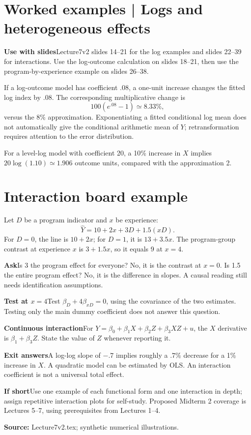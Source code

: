 \documentclass[11pt,a4paper]{article}
\newcommand{\heading}[1]{\section*{\color{accent}#1}}
\newcommand{\cue}[2]{\par\noindent\textbf{#1}\quad #2\par}
\begin{document}
\newpage
\heading{Worked examples | Logs and heterogeneous effects}
\cue{Use with slides}{Lecture7v2 slides 14--21 for the log examples and slides 22--39 for interactions. Use the log-outcome calculation on slides 18--21, then use the program-by-experience example on slides 26--38.}
If a log-outcome model has coefficient $.08$, a one-unit increase changes the fitted log index by $.08$. The corresponding multiplicative change is
\[
100(e^{.08}-1)\simeq8.33\%,
\]
versus the 8\% approximation. Exponentiating a fitted conditional log mean does not automatically give the conditional arithmetic mean of $Y$; retransformation requires attention to the error distribution.

For a level-log model with coefficient 20, a 10\% increase in $X$ implies $20\log(1.10)\simeq1.906$ outcome units, compared with the approximation 2.
\heading{Interaction board example}
Let $D$ be a program indicator and $x$ be experience:
\[
\widehat Y=10+2x+3D+1.5(xD).
\]
For $D=0$, the line is $10+2x$; for $D=1$, it is $13+3.5x$. The program-group contrast at experience $x$ is $3+1.5x$, so it equals 9 at $x=4$.
\cue{Ask}{Is 3 the program effect for everyone? No, it is the contrast at $x=0$. Is 1.5 the entire program effect? No, it is the difference in slopes. A causal reading still needs identification assumptions.}
\cue{Test at $x=4$}{Test $\beta_D+4\beta_{xD}=0$, using the covariance of the two estimates. Testing only the main dummy coefficient does not answer this question.}
\cue{Continuous interaction}{For $Y=\beta_0+\beta_1X+\beta_2Z+\beta_3XZ+u$, the $X$ derivative is $\beta_1+\beta_3Z$. State the value of $Z$ whenever reporting it.}
\cue{Exit answers}{A log-log slope of $-.7$ implies roughly a $.7$\% decrease for a 1\% increase in $X$. A quadratic model can be estimated by OLS. An interaction coefficient is not a universal total effect.}
\cue{If short}{Use one example of each functional form and one interaction in depth; assign repetitive interaction plots for self-study. Proposed Midterm 2 coverage is Lectures 5--7, using prerequisites from Lectures 1--4.}
\textbf{Source:} Lecture7v2.tex; synthetic numerical illustrations.
\end{document}
